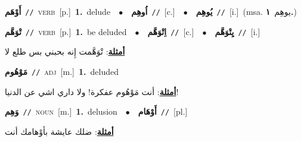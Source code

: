 \documentclass[10pt,a4paper,twoside]{article} %
\begin{document}
\begin{multicols}{2}
{\setlength\topsep{0pt}\textbf{\foreignlanguage{arabic}{أَوْهَم}}\ {\color{gray}\texttt{//}\color{black}}\ \textsc{verb}\ [p.]\ \textbf{1.}~delude\ \ $\bullet$\ \ \setlength\topsep{0pt}\textbf{\foreignlanguage{arabic}{اُوهِم}}\ {\color{gray}\texttt{//}\color{black}}\ [c.]\ \ $\bullet$\ \ \setlength\topsep{0pt}\textbf{\foreignlanguage{arabic}{يُوهِم}}\ {\color{gray}\texttt{//}\color{black}}\ [i.]\ \color{gray}(msa. \foreignlanguage{arabic}{يوهِم}~\foreignlanguage{arabic}{\textbf{١.}})\color{black}\ } \vspace{2mm}

{\setlength\topsep{0pt}\textbf{\foreignlanguage{arabic}{تْوَهَّم}}\ {\color{gray}\texttt{//}\color{black}}\ \textsc{verb}\ [p.]\ \textbf{1.}~be deluded\ \ $\bullet$\ \ \setlength\topsep{0pt}\textbf{\foreignlanguage{arabic}{اِتْوَهَّم}}\ {\color{gray}\texttt{//}\color{black}}\ [c.]\ \ $\bullet$\ \ \setlength\topsep{0pt}\textbf{\foreignlanguage{arabic}{يِتْوَهَّم}}\ {\color{gray}\texttt{//}\color{black}}\ [i.]\  \begin{flushright}\color{gray}\foreignlanguage{arabic}{\textbf{\underline{\foreignlanguage{arabic}{أمثلة}}}: تْوَهَّمت إِنه بحبني بس طلع لا}\end{flushright}\color{black}} \vspace{2mm}

{\setlength\topsep{0pt}\textbf{\foreignlanguage{arabic}{مَوْهُوم}}\ {\color{gray}\texttt{//}\color{black}}\ \textsc{adj}\ [m.]\ \textbf{1.}~deluded\  \begin{flushright}\color{gray}\foreignlanguage{arabic}{\textbf{\underline{\foreignlanguage{arabic}{أمثلة}}}: أنت مَوْهُوم عفكرة! ولا داري اشي عن الدنيا!}\end{flushright}\color{black}} \vspace{2mm}

{\setlength\topsep{0pt}\textbf{\foreignlanguage{arabic}{وَهِم}}\ {\color{gray}\texttt{//}\color{black}}\ \textsc{noun}\ [m.]\ \textbf{1.}~delusion\ \ $\bullet$\ \ \setlength\topsep{0pt}\textbf{\foreignlanguage{arabic}{أَوْهَام}}\ {\color{gray}\texttt{//}\color{black}}\ [pl.]\  \begin{flushright}\color{gray}\foreignlanguage{arabic}{\textbf{\underline{\foreignlanguage{arabic}{أمثلة}}}: ضلك عايشة بأوْهامك أنت}\end{flushright}\color{black}} \vspace{2mm}


\end{multicols}
\end{document}
